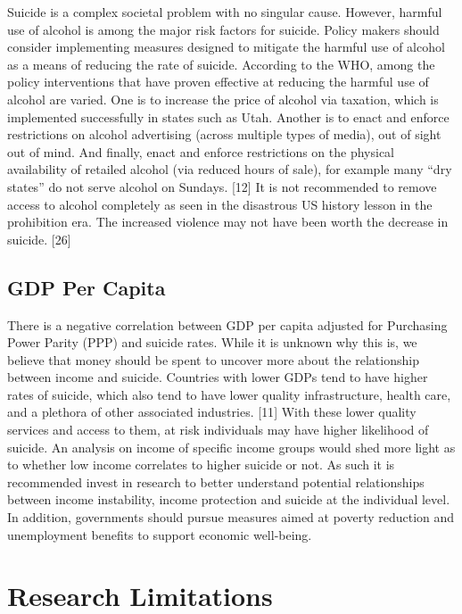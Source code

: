 \documentclass[]{article}
\begin{document}
Suicide is a complex societal problem with no singular cause. However,
harmful use of alcohol is among the major risk factors for suicide.
Policy makers should consider implementing measures designed to mitigate
the harmful use of alcohol as a means of reducing the rate of suicide.
According to the WHO, among the policy interventions that have proven
effective at reducing the harmful use of alcohol are varied. One is to
increase the price of alcohol via taxation, which is implemented
successfully in states such as Utah. Another is to enact and enforce
restrictions on alcohol advertising (across multiple types of media),
out of sight out of mind. And finally, enact and enforce restrictions on
the physical availability of retailed alcohol (via reduced hours of
sale), for example many ``dry states'' do not serve alcohol on Sundays.
{[}12{]} It is not recommended to remove access to alcohol completely as
seen in the disastrous US history lesson in the prohibition era. The
increased violence may not have been worth the decrease in suicide.
{[}26{]}

\subsection{GDP Per Capita}\label{gdp-per-capita}

There is a negative correlation between GDP per capita adjusted for
Purchasing Power Parity (PPP) and suicide rates. While it is unknown why
this is, we believe that money should be spent to uncover more about the
relationship between income and suicide. Countries with lower GDPs tend
to have higher rates of suicide, which also tend to have lower quality
infrastructure, health care, and a plethora of other associated
industries. {[}11{]} With these lower quality services and access to
them, at risk individuals may have higher likelihood of suicide. An
analysis on income of specific income groups would shed more light as to
whether low income correlates to higher suicide or not. As such it is
recommended invest in research to better understand potential
relationships between income instability, income protection and suicide
at the individual level. In addition, governments should pursue measures
aimed at poverty reduction and unemployment benefits to support economic
well-being.

\section{Research Limitations}\label{research-limitations}
\end{document}

